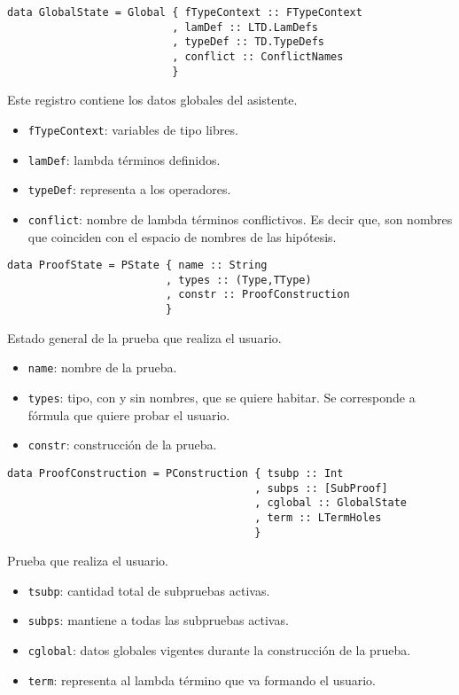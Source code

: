 \documentclass[a4paper,11pt]{article}
\theoremstyle{definition}
\begin{document}
\begin{verbatim}
data GlobalState = Global { fTypeContext :: FTypeContext
                          , lamDef :: LTD.LamDefs
                          , typeDef :: TD.TypeDefs
                          , conflict :: ConflictNames
                          }
\end{verbatim}

Este registro contiene los datos globales del asistente.
\begin{itemize}
  \item \texttt{fTypeContext}: variables de tipo libres.
  \item \texttt{lamDef}: lambda términos definidos.
  \item \texttt{typeDef}: representa a los operadores.
  \item \texttt{conflict}: nombre de lambda términos conflictivos. Es decir que, son nombres
    que coinciden con el espacio de nombres de las hipótesis.
\end{itemize}

\begin{verbatim}
data ProofState = PState { name :: String
                         , types :: (Type,TType)
                         , constr :: ProofConstruction
                         }
\end{verbatim}

Estado general de la prueba que realiza el usuario.
\begin{itemize}
  \item \texttt{name}: nombre de la prueba.
  \item \texttt{types}: tipo, con y sin nombres, que se quiere habitar. Se corresponde a fórmula que quiere probar el usuario.
  \item \texttt{constr}: construcción de la prueba.
\end{itemize}

\begin{verbatim}
data ProofConstruction = PConstruction { tsubp :: Int
                                       , subps :: [SubProof]
                                       , cglobal :: GlobalState
                                       , term :: LTermHoles
                                       }
\end{verbatim}

Prueba que realiza el usuario.
\begin{itemize}
  \item \texttt{tsubp}: cantidad total de subpruebas activas.
  \item \texttt{subps}: mantiene a todas las subpruebas activas.
  \item \texttt{cglobal}: datos globales vigentes durante la construcción de la prueba.
  \item \texttt{term}: representa al lambda término que va formando el usuario.
\end{itemize}
\end{document}
